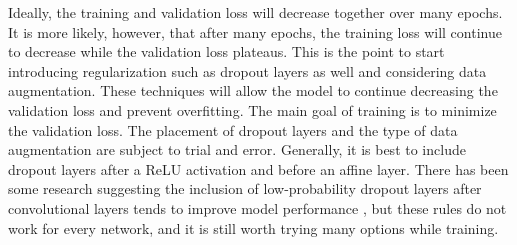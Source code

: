 Ideally, the training and validation loss will decrease together over many epochs. It is more likely, however, that after many epochs, the training loss will continue to decrease while the validation loss plateaus. This is the point to start introducing regularization such as dropout layers as well and considering data augmentation. These techniques will allow the model to continue decreasing the validation loss and prevent overfitting. The main goal of training is to minimize the validation loss. The placement of dropout layers and the type of data augmentation are subject to trial and error. Generally, it is best to include dropout layers after a ReLU activation and before an affine layer. There has been some research suggesting the inclusion of low-probability dropout layers after convolutional layers tends to improve model performance \cite{conv-dropout-layers} \cite{conv-dropout-layers2}, but these rules do not work for every network, and it is still worth trying many options while training.







